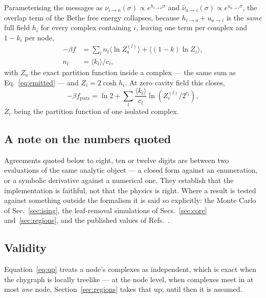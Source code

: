 \documentclass[aps,pre,twocolumn,superscriptaddress,floatfix]{revtex4-2}
\newcommand{\ave}[1]{\langle #1 \rangle}
\begin{document}
Parameterising the messages as $\nu_{i\to a}(\sigma)\propto e^{h_{i\to
a}\sigma}$ and $\hat\nu_{a\to i}(\sigma)\propto e^{u_{a\to i}\sigma}$, the
overlap term of the Bethe free energy collapses, because $h_{i\to a}+u_{a\to i}$
is the \emph{same} full field $h_i$ for every complex containing $i$, leaving
one term per complex and $1-k_i$ per node,
\begin{equation}
  \begin{split}
    -\beta f&=\sum_l n_l\ave{\ln Z^{(l)}_a}+\ave{(1-k)\ln Z_i},\\
    n_l&=\ave{k_l}/c_l,
  \end{split}
  \label{eq:bethe}
\end{equation}
with $Z_a$ the exact partition function inside a complex --- the same sum as
Eq.~\eqref{eq:emitted} --- and $Z_i=2\cosh h_i$. At zero cavity field this
closes,
\begin{equation}
  -\beta f_{\mathrm{para}}=\ln 2+\sum_l\frac{\ave{k_l}}{c_l}
    \ln\!\left(Z^{(l)}_c/2^{c_l}\right),
  \label{eq:para}
\end{equation}
$Z_c$ being the partition function of one isolated complex.

\subsection{A note on the numbers quoted}
\label{sec:numbers}

Agreements quoted below to eight, ten or twelve digits are between two
evaluations of the same analytic object --- a closed form against an
enumeration, or a symbolic derivative against a numerical one. They establish
that the implementation is faithful, not that the physics is right. Where a
result is tested against something outside the formalism it is said so
explicitly: the Monte Carlo of Sec.~\ref{sec:ising}, the leaf-removal
simulations of Secs.~\ref{sec:core} and~\ref{sec:regions}, and the published
values of Refs.~\cite{WH00,BG01,MT07,SLG26}.

\subsection{Validity}
\label{sec:validity}

Equation~\eqref{eq:up} treats a node's complexes as independent, which is exact
when the chygraph is locally treelike --- at the node level, when complexes meet
in at most \emph{one} node. Section~\ref{sec:regions} takes that up; until then
it is assumed.
\end{document}
